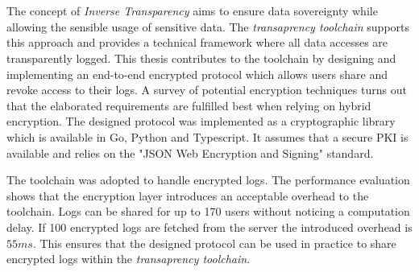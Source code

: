 \documentclass[../main.tex]{subfiles}
\begin{document}
\chapter*{\myAbstractTitle}

The concept of \emph{Inverse Transparency} aims to ensure data sovereignty while allowing the sensible usage of sensitive data.
The \emph{transaprency toolchain} supports this approach and provides a technical framework where all data accesses are transparently logged.  
This thesis contributes to the toolchain by designing and implementing an end-to-end encrypted protocol which allows users share and revoke access to their logs.
A survey of potential encryption techniques turns out that the elaborated requirements are fulfilled best when relying on hybrid encryption.
The designed protocol was implemented as a cryptographic library which is available in Go, Python and Typescript.
It assumes that a secure PKI is available and relies on the "JSON Web Encryption and Signing" standard.

The toolchain was adopted to handle encrypted logs.
The performance evaluation shows that the encryption layer introduces an acceptable overhead to the toolchain.
Logs can be shared for up to 170 users without noticing a computation delay.
If 100 encrypted logs are fetched from the server the introduced overhead is $55ms$.
This ensures that the designed protocol can be used in practice to share encrypted logs within the \emph{transaprency toolchain}.
\end{document}

